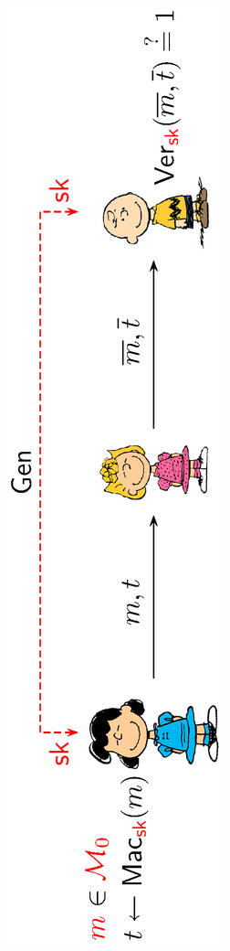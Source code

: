\documentclass[landscape,footrule]{foils}
\begin{document}
\titlefoil








\centerline{\includegraphics[scale=0.8, angle=-90, clip, trim=1.5cm 1.5cm 14.0cm
  1.5cm]{symmetric-authentication.eps}} 
\end{document}
